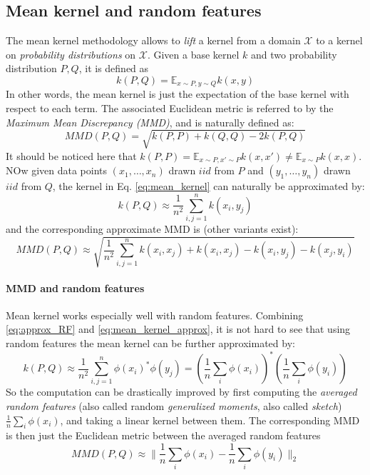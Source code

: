\subsection{Mean kernel and random features} \label{subsec:MMD}
The mean kernel methodology allows to \emph{lift} a kernel from a domain $\mathcal{X}$ to a kernel on \emph{probability distributions} on $\mathcal{X}$. Given a base kernel $k$ and two probability distribution $P,Q$, it is defined as
\begin{equation}\label{eq:mean_kernel}
k(P,Q) = \mathbb{E}_{x \sim P, y \sim Q} k(x,y)
\end{equation}
In other words, the mean kernel is just the expectation of the base kernel with respect to each term. The associated Euclidean metric is referred to by the  \emph{Maximum Mean Discrepancy (MMD)}, and is naturally defined as:
\begin{equation}\label{eq:MMD}
MMD(P,Q) = \sqrt{k(P,P) + k(Q,Q) - 2k(P,Q)}
\end{equation}
It should be noticed here that $k(P,P) = \mathbb{E}_{x \sim P, x' \sim P} k(x,x') \neq \mathbb{E}_{x \sim P} k(x,x)$.
NOw given data points $(x_1, \ldots, x_n)$ drawn $iid$ from $P$ and $(y_1, \ldots, y_n)$ drawn $iid$ from $Q$, the kernel in Eq. \ref{eq:mean_kernel} can naturally be approximated by:
\begin{equation}\label{eq:mean_kernel_approx}
k(P,Q) \approx \frac{1}{n^2} \sum_{i,j=1}^n k(x_i,y_j)
\end{equation}
and the corresponding approximate MMD is (other variants exist):
\[
MMD(P,Q) \approx \sqrt{\frac{1}{n^2} \sum_{i,j=1}^n k(x_i,x_j) + k(x_i,x_j) - k(x_i,y_j) - k(x_j, y_i)}
\]

\paragraph{MMD and random features}
Mean kernel works especially well with random features. Combining \eqref{eq:approx_RF} and \eqref{eq:mean_kernel_approx}, it is not hard to see that using random features the mean kernel can be further approximated by:
\begin{equation}
\label{eq:mean_kernel_RF}
k(P,Q) \approx \frac{1}{n^2} \sum_{i,j=1}^n \phi(x_i)^*\phi(y_j) = \left(\frac{1}{n} \sum_i \phi(x_i)\right)^* \left(\frac{1}{n} \sum_i \phi(y_i)\right)
\end{equation}
So the computation can be drastically improved by first computing the \emph{averaged random features} (also called random \emph{generalized moments}, also called \emph{sketch}) $\frac{1}{n} \sum_i \phi(x_i)$, and taking a linear kernel between them. The corresponding MMD is then just the Euclidean metric between the averaged random features
\[
MMD(P,Q) \approx \| \frac{1}{n} \sum_i \phi(x_i) - \frac{1}{n} \sum_i \phi(y_i)\|_2
\]

